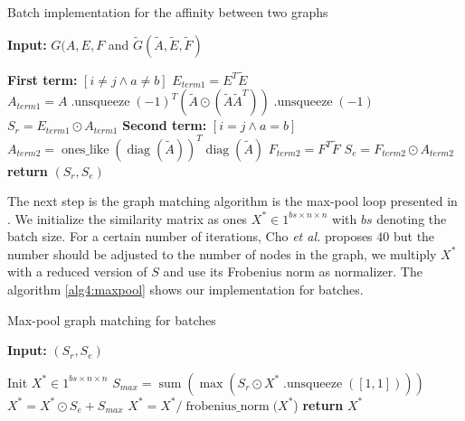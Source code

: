 \begin{algorithm}[H]
    \caption{Batch implementation for the affinity between two graphs }
    \hspace*{\algorithmicindent} \textbf{Input:} $G(A,E,F$ and $\tilde{G}(\tilde{A},\tilde{E},\tilde{F})$
    \begin{algorithmic}[1]
        \Statex \textbf{First term:} $[i \neq j \wedge a \neq b]$
        \State $E_{term1} = E^T  \tilde{E}$ 
        \State $A_{term1} = A\operatorname{.unsqueeze}(-1)^T (\tilde{A} \odot (\tilde{A}  \tilde{A}^T))\operatorname{.unsqueeze}(-1)$ 
        \State $S_r = E_{term1} \odot A_{term1}$
        \Statex \textbf{Second term:} $[i=j \wedge a=b]$
        \State $A_{term2} = \operatorname{ones\_like}(\operatorname{diag}(\tilde{A}))^T \operatorname{diag}(\tilde{A})$
        \State $F_{term2} = F^T  \tilde{F}$ 
        \State $S_e = F_{term2} \odot A_{term2}$
        \State \textbf{return} $(S_r, S_e)$
    \end{algorithmic}
    \label{alg4:s}
\end{algorithm}


The next step is the graph matching algorithm is the max-pool loop presented in \cite{cho_finding_2014}. We initialize the similarity matrix as ones $X^* \in 1^{bs\times n \times n}$ with $bs$ denoting the batch size. For a certain number of iterations, Cho \textit{et al.} proposes $40$ but the number should be adjusted to the number of nodes in the graph, we multiply $X^*$ with a reduced version of $S$ and use its Frobenius norm as normalizer. The algorithm \ref{alg4:maxpool} shows our implementation for batches.


\begin{algorithm}
    \caption{Max-pool graph matching for batches}
    \hspace*{\algorithmicindent} \textbf{Input:} $(S_r, S_e)$
    \begin{algorithmic}[1]
        \State Init $X^* \in 1^{bs\times n \times n}$
            \State $S_{max} = \operatorname{sum}(\operatorname{max}(S_r \odot X^*\operatorname{.unsqueeze}([1,1])))$ 
            \State $X^* = X^* \odot S_e + S_{max}$
            \State $X^* = X^* / \operatorname{frobenius\_norm}(X^*$)
        \EndFor
        \State \textbf{return} $X^*$
    \end{algorithmic}
    \label{alg4:maxpool}
\end{algorithm}


